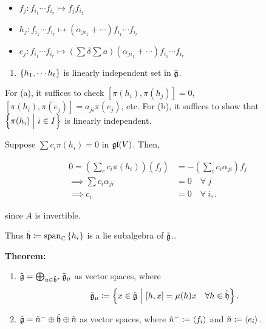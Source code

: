 \begin{itemize}
\tightlist
\item
  \(f_j: f_{i_1} \cdots f_{i_r} \mapsto f_j f_{i_1}\)
\item
  \(h_j: f_{i_1} \cdots f_{i_r} \mapsto (\alpha_{ji_1} + \cdots )f_{i_1} \cdots f_{i_r}\)
\item
  \(e_j: f_{i_1} \cdots f_{i_r} \mapsto (\sum \delta_{} \sum a)(\alpha_{ji_1} + \cdots )f_{i_1} \cdots f_{i_r}\)
\end{itemize}

\begin{enumerate}
\def\labelenumi{\alph{enumi}.}
\setcounter{enumi}{1}
\tightlist
\item
  \(\left\{{h_1, \cdots h_\ell}\right\}\) is linearly independent set in
  \(\tilde {{\mathfrak{g}}}\).
\end{enumerate}

For (a), it suffices to check \([\pi(h_i), \pi(h_j)] = 0\),
\([\pi(h_i), \pi(e_j)] = a_{ji} \pi(e_j)\), etc. For (b), it suffices to
show that \(\left\{{\pi(h_i) \mathrel{\Big|} i\in I}\right\}\) is linearly independent.

Suppose \(\sum c_i \pi(h_i) = 0\) in \({\mathfrak{gl}}(V)\). Then,

\begin{align*}
0 = \left( \sum_c c_i \pi(h_i) \right)(f_j) 
&= -\left( \sum_i c_i \alpha_{ji} \right) f_j \\
\implies \sum c_i \alpha_{ji} &= 0 \quad \forall ~j \\
\implies c_i &= 0 \quad \forall~i,
.\end{align*}

since \(A\) is invertible.

Thus \(\tilde {{\mathfrak{h}}} \coloneqq \mathrm{span}_{\mathbb{C}}\left\{{h_i}\right\}\) is a lie
subalgebra of \(\tilde{{\mathfrak{g}}}\)..

\textbf{Theorem:}

\begin{enumerate}
\def\labelenumi{\alph{enumi}.}
\item
  \(\tilde {{\mathfrak{g}}} = \bigoplus_{u\in \tilde{{\mathfrak{h}}}^*} \tilde {{\mathfrak{g}}}_\mu\) as
  vector spaces, where \[
  \tilde{{\mathfrak{g}}}_\mu \coloneqq \left\{{x\in\tilde{{\mathfrak{g}}}{~\mathrel{\Big|}~} [h, x] = \mu(h) x \quad \forall h\in\tilde{{\mathfrak{h}}}}\right\}.
  \]
\item
  \(\tilde{{\mathfrak{g}}} = \tilde n^- \oplus \tilde{{\mathfrak{h}}} \oplus \tilde n\) as
  vector spaces, where \(\tilde n^- \coloneqq \left\langle{f_i}\right\rangle\) and
  \(\tilde n \coloneqq \left\langle{e_i}\right\rangle\).
\end{enumerate}

